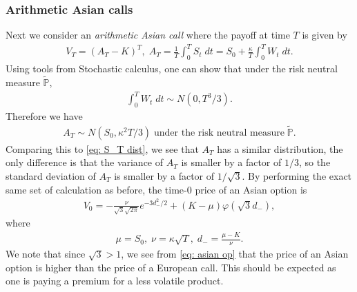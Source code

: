 \documentclass[reqno]{amsart}
\begin{document}
\subsubsection{Arithmetic Asian calls}
Next we consider an \emph{arithmetic Asian call} where the payoff at time $T$ is given by 
\begin{align} \label{eq: asian}
	 V_T = (A_T - K)^T, \; A_T = \frac{1}{T}\int_0^T S_t \; dt = S_0 + \frac{\kappa}{T} \int_0^T W_t \; dt. 
\end{align}
Using tools from Stochastic calculus, one can show that under the risk neutral measure $\tilde{\mathbb{P}}$, 
\begin{align}
	 \int_0^T W_t \; dt \sim N(0, T^3/3).
\end{align}
Therefore we have 
\begin{align}
	 A_T \sim N(S_0, \kappa^2 T/3) \; \text{under the risk neutral measure} \; \tilde{\mathbb{P}}.
\end{align}
Comparing this to \eqref{eq: S_T dist}, we see that $A_T$ has a similar distribution, the only difference is that the variance of $A_T$ is smaller by a factor of $1/3$, so the standard deviation of $A_T$ is smaller by a factor of $1/\sqrt{3}$. By performing the exact same set of calculation as before, the time-0 price of an Asian option is 
\begin{align} \label{eq: asian op}
	 V_0 = -\frac{\nu}{\sqrt{3}\sqrt{2\pi}} e^{-3d_-^2/2} + (K-\mu) \varphi(\sqrt{3}d_-),
\end{align}
where 
\begin{align}
	 \mu = S_0, \; \nu = \kappa \sqrt{T}, \; d_- = \frac{\mu - K}{\nu}.
\end{align}
We note that since $\sqrt{3} > 1$, we see from \eqref{eq: asian op} that the price of an Asian option is higher than the price of a European call. This should be expected as one is paying a premium for a less volatile product. 
\end{document}
